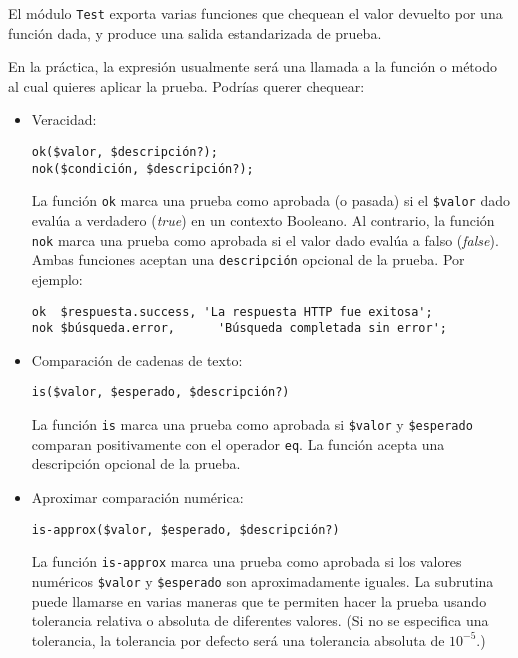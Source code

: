 El módulo \verb|Test| exporta varias funciones que chequean el valor devuelto
por una función dada, y produce una salida estandarizada 
de prueba.

En la práctica, la expresión usualmente será una llamada a la función 
o método al cual quieres aplicar la prueba. Podrías querer chequear:

\begin{itemize}
\item Veracidad: 
\begin{verbatim}
ok($valor, $descripción?); 
nok($condición, $descripción?);
\end{verbatim}

La función {\tt ok} marca una prueba como aprobada (o pasada) si el
\verb|$valor| dado evalúa a verdadero (\emph{true}) en un
contexto Booleano. Al contrario, la función {\tt nok} marca
una prueba como aprobada si el valor dado evalúa a falso (\emph{false}).
Ambas funciones aceptan una \verb|descripción| opcional de
la prueba.
Por ejemplo:

\begin{verbatim}
ok  $respuesta.success, 'La respuesta HTTP fue exitosa';
nok $búsqueda.error,      'Búsqueda completada sin error';
\end{verbatim}

\item Comparación de cadenas de texto:
\begin{verbatim}
is($valor, $esperado, $descripción?)
\end{verbatim}

La función {\tt is} marca una prueba como aprobada si \verb|$valor|
y \verb|$esperado| comparan positivamente con el operador \verb|eq|.
La función acepta una descripción opcional de la prueba.

\item Aproximar comparación numérica:

\begin{verbatim}
is-approx($valor, $esperado, $descripción?)
\end{verbatim}

La función {\tt is-approx} marca una prueba como aprobada si los
valores numéricos \verb|$valor| y \verb|$esperado| son aproximadamente
iguales. La subrutina puede llamarse en varias maneras que te permiten
hacer la prueba usando tolerancia relativa o absoluta de diferentes
valores. (Si no se especifica una tolerancia, la tolerancia por defecto
será una tolerancia absoluta de $10^{-5}$.)


\end{itemize}
